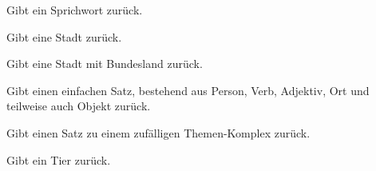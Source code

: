 \documentclass[a4paper,12pt,oneside]{sphinxmanual}
\begin{document}

\begin{fulllineitems}
\label{funktionen:pyzufall.sprichwort}
Gibt ein Sprichwort zurück.

\end{fulllineitems}


\begin{fulllineitems}
\label{funktionen:pyzufall.stadt}
Gibt eine Stadt zurück.

\end{fulllineitems}


\begin{fulllineitems}
\label{funktionen:pyzufall.stadt_bl}
Gibt eine Stadt mit Bundesland zurück.

\end{fulllineitems}


\begin{fulllineitems}
\label{funktionen:pyzufall.standard_satz}
Gibt einen einfachen Satz, bestehend aus Person, Verb, Adjektiv, Ort und teilweise auch Objekt zurück.

\end{fulllineitems}


\begin{fulllineitems}
\label{funktionen:pyzufall.themen_satz}
Gibt einen Satz zu einem zufälligen Themen-Komplex zurück.

\end{fulllineitems}


\begin{fulllineitems}
\label{funktionen:pyzufall.tier}
Gibt ein Tier zurück.

\end{fulllineitems}
\end{document}
